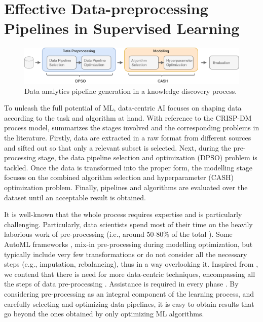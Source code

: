 
\chapter{Effective Data-preprocessing Pipelines in Supervised Learning}
\label{data-centric-chap:supervised}

\begin{figure}[t]
    \centering
    \includegraphics[width=1.0\textwidth]{chapters/data-centric/supervised/img/data-analytics-pipeline.pdf}
    \caption{Data analytics pipeline generation in a knowledge discovery process.}
    \label{effective-fig:data-analytics-pipeline}
\end{figure}

To unleash the full potential of ML, data-centric AI focuses on shaping data according to the task and algorithm at hand.
With reference to the CRISP-DM process model,   summarizes the stages involved and the corresponding problems in the literature.
Firstly, data are extracted in a raw format from different sources and sifted out so that only a relevant subset is selected.
Next, during the pre-processing stage, the data pipeline selection and optimization (DPSO) \cite{Quemy19DOLAP} problem is tackled.
Once the data is transformed into the proper form, the modelling stage focuses on the combined algorithm selection and hyperparameter (CASH) optimization problem.
Finally, pipelines and algorithms
are evaluated over the dataset until an acceptable result is obtained.

It is well-known that the whole process requires expertise and is particularly challenging.
Particularly, data scientists spend most of their time on the heavily laborious work of pre-processing (i.e., around 50-80\% of the total \cite{Munson09Pre}).
Some AutoML frameworks \cite{auto_sklearn, mohr2018ml}, mix-in pre-processing during modelling optimization, but typically include very few transformations or do not consider all the necessary steps (e.g., imputation, rebalancing), thus in a way overlooking it.
Inspired from \cite{Munoz09DOLAP}, we contend that there is need for more data-centric techniques, encompassing all the steps of data pre-processing \cite{Vaisman14Book}.
Assistance is required in every phase \cite{Bilalli16IOTBD}.
By considering pre-processing as an integral component of the learning process, and carefully selecting and optimizing data pipelines, it is easy to obtain results that go beyond the ones obtained by only optimizing ML algorithms.

